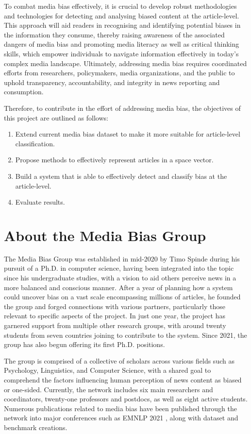 To combat media bias effectively, it is crucial to develop robust methodologies and technologies for detecting and analysing biased content at the article-level. This approach will aid readers in recognising and identifying potential biases in the information they consume, thereby raising awareness of the associated dangers of media bias and promoting media literacy as well as critical thinking skills, which empower individuals to navigate information effectively in today's complex media landscape. Ultimately, addressing media bias requires coordinated efforts from researchers, policymakers, media organizations, and the public to uphold transparency, accountability, and integrity in news reporting and consumption.

Therefore, to contribute in the effort of addressing media bias, the objectives of this project are outlined as follows:
\begin{enumerate}
    \item Extend current media bias dataset to make it more suitable for article-level classification.
    \item Propose methods to effectively represent articles in a space vector.
    \item Build a system that is able to effectively detect and classify bias at the article-level.
    \item Evaluate results.
\end{enumerate}

\section{About the Media Bias Group}

The Media Bias Group \cite{media-bias-group} was established in mid-2020 by Timo Spinde during his pursuit of a Ph.D. in computer science, having been integrated into the topic since his undergraduate studies, with a vision to aid others perceive news in a more balanced and conscious manner. After a year of planning how a system could uncover bias on a vast scale encompassing millions of articles, he founded the group and forged connections with various partners, particularly those relevant to specific aspects of the project. In just one year, the project has garnered support from multiple other research groups, with around twenty students from seven countries joining to contribute to the system. Since 2021, the group has also begun offering its first Ph.D. positions.

The group is comprised of a collective of scholars across various fields such as Psychology, Linguistics, and Computer Science, with a shared goal to comprehend the factors influencing human perception of news content as biased or one-sided. Currently, the network includes six main researchers and coordinators, twenty-one professors and postdocs, as well as eight active students. Numerous publications related to media bias have been published through the network into major conferences such as EMNLP 2021 \cite{spinde-2021-babe}, along with dataset and benchmark creations.


